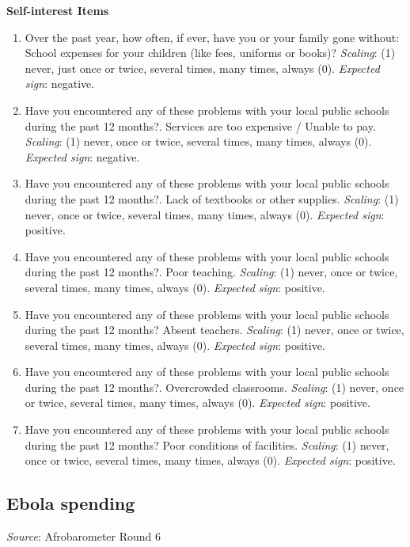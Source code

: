 \documentclass[]{article}
\begin{document}
\textbf{Self-interest Items}

\begin{enumerate}
  \item Over the past year, how often, if ever, have you or your family gone without: School expenses for your children (like fees, uniforms or books)? \textit{Scaling}: (1) never, just once or twice, several times, many times, always (0). \textit{Expected sign}: negative.
  \item Have you encountered any of these problems with your local public schools during the past 12 months?. Services are too expensive / Unable to pay. \textit{Scaling}: (1) never, once or twice, several times, many times, always (0). \textit{Expected sign}: negative.
  \item Have you encountered any of these problems with your local public schools during the past 12 months?. Lack of textbooks or other supplies. \textit{Scaling}: (1) never, once or twice, several times, many times, always (0). \textit{Expected sign}: positive.
  \item Have you encountered any of these problems with your local public schools during the past 12 months?. Poor teaching. \textit{Scaling}: (1) never, once or twice, several times, many times, always (0). \textit{Expected sign}: positive.
  \item Have you encountered any of these problems with your local public schools during the past 12 months? Absent teachers. \textit{Scaling}: (1) never, once or twice, several times, many times, always (0). \textit{Expected sign}: positive.
  \item Have you encountered any of these problems with your local public schools during the past 12 months?. Overcrowded classrooms. \textit{Scaling}: (1) never, once or twice, several times, many times, always (0). \textit{Expected sign}: positive.
  \item Have you encountered any of these problems with your local public schools during the past 12 months? Poor conditions of facilities. \textit{Scaling}: (1) never, once or twice, several times, many times, always (0). \textit{Expected sign}: positive.
\end{enumerate}

\subsection{Ebola spending}\label{ebola-spending}

\textit{Source}: Afrobarometer Round 6
\end{document}
